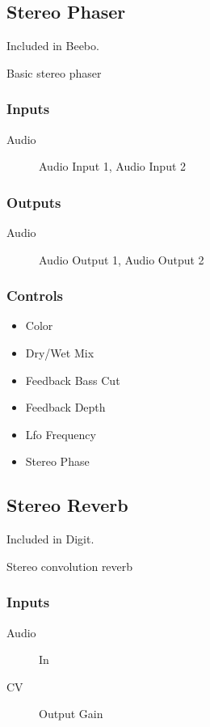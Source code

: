 \subsection{Stereo Phaser}

Included in Beebo.

Basic stereo phaser



\subsubsection{Inputs}
\begin{description}
\item [Audio] Audio Input 1, Audio Input 2
\end{description}

\subsubsection{Outputs}
\begin{description}
\item [Audio] Audio Output 1, Audio Output 2
\end{description}

\subsubsection{Controls}
\begin{itemize}
\item Color
\item Dry/Wet Mix
\item Feedback Bass Cut
\item Feedback Depth
\item Lfo Frequency
\item Stereo Phase
\end{itemize}

\subsection{Stereo Reverb}

Included in Digit.

Stereo convolution reverb



\subsubsection{Inputs}
\begin{description}
\item [Audio] In
\item [CV] Output Gain
\end{description}

